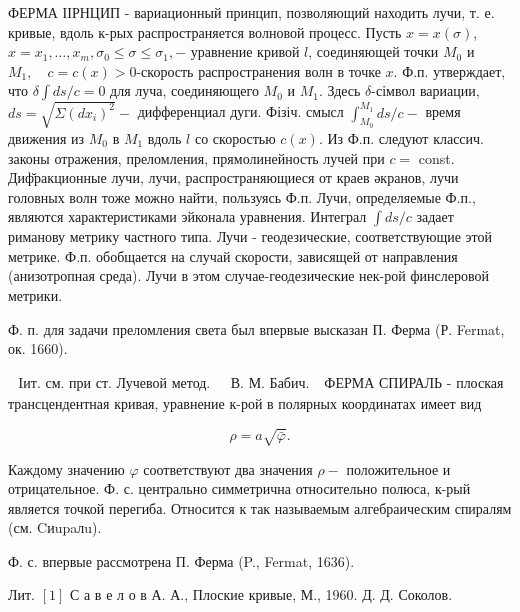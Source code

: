 \documentclass[10pt]{article}
\begin{document}
ФЕРМА ІІРНЦИП - вариационный принцип, позволяющий находить лучи, т. е. кривые, вдоль к-рых распространяется волновой процесс. Пусть $x=x(\sigma)$, $x=x_{1}, \ldots, x_{m}, \sigma_{0} \leqslant \sigma \leqslant \sigma_{1},-$ уравнение кривой $l$, соединяющей точки $M_{0}$ и $M_{1}, \quad c=c(x)>0$-скорость распространения волн в точке $x$. Ф.п. утверждает, что $\delta \int d s / c=0$ для луча, соединяющего $M_{0}$ и $M_{1}$. Здесь $\delta$-сімвол вариации, $d s=\sqrt{\Sigma\left(d x_{i}\right)^{2}}-$ дифференциал дуги. Фізіч. смысл $\int_{M_{0}}^{M_{1}} d s / c-$ время движения из $M_{0}$ в $M_{1}$ вдоль $l$ со скоростью $c(x)$. Из Ф.п. следуют классич. законы отражения, преломления, прямолинейность лучей при $c=$ const. Диф̆ракционные лучи, лучи, распространяющиеся от краев әкранов, лучи головных волн тоже можно найти, пользуясь Ф.п. Лучи, определяемые Ф.п., являются характеристиками эйконала уравнения. Интеграл $\int d s / c$ задает риманову метрику частного типа. Лучи - геодезические, соответствующие этой метрике. Ф.п. обобщается на случай скорости, зависящей от направления (анизотропная среда). Лучи в этом случае-геодезические нек-рой финслеровой метрики.



Ф. п. для задачи преломления света был впервые высказан П. Ферма (Р. Fermat, ок. 1660).



$\begin{array}{ll}\text { Iит. см. при ст. Лучевой метод. } & \text { В. М. Бабич. }\end{array}$ ФЕРМА СПИРАЛЬ - плоская трансцендентная кривая, уравнение к-рой в полярных координатах имеет вид



\[

\rho=a \sqrt{\bar{\varphi}} .

\]



Каждому значению $\varphi$ соответствуют два значения $\rho-$ положительное и отрицательное. Ф. с. центрально симметрична относительно полюса, к-рый является точкой перегиба. Относится к так называемым алгебраическим спиралям (см. Cиupaлu).



Ф. с. впервые рассмотрена П. Ферма (P., Fermat, 1636).



Лит. $[1]$ С а в е л о в А. А., Плоские кривые, М., 1960. Д. Д. Соколов.
\end{document}
